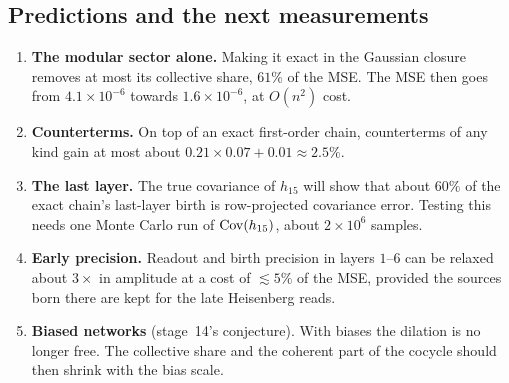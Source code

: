 \subsection{Predictions and the next measurements}
\begin{enumerate}[leftmargin=*]
\item \textbf{The modular sector alone.} Making it exact in the Gaussian closure removes at most its collective share, $61\%$ of the MSE. The
MSE then goes from $4.1\times10^{-6}$ towards $1.6\times10^{-6}$, at $O(n^2)$ cost.
\item \textbf{Counterterms.} On top of an exact first-order chain, counterterms of any kind gain at most about
$0.21\times0.07+0.01\approx2.5\%$.
\item \textbf{The last layer.} The true covariance of $h_{15}$ will show that about $60\%$ of the exact chain's last-layer birth is
row-projected covariance error. Testing this needs one Monte Carlo run of $\operatorname{Cov}(h_{15})$, about $2\times10^6$ samples.
\item \textbf{Early precision.} Readout and birth precision in layers $1$--$6$ can be relaxed about $3\times$ in amplitude at a cost of $\lesssim5\%$
of the MSE, provided the sources born there are kept for the late Heisenberg reads.
\item \textbf{Biased networks} (stage~14's conjecture). With biases the dilation is no longer free. The collective share and the
coherent part of the cocycle should then shrink with the bias scale.
\end{enumerate}
